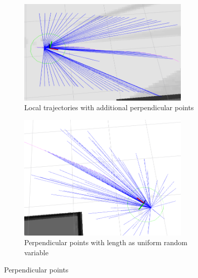 \documentclass[capstone_report.tex]{subfiles}
\begin{document}
\begin{figure}[H]
    \centering
    \begin{subfigure}{0.5\textwidth}
        \centering
        \includegraphics[width=0.9\textwidth]{imgs/local_traj_gen_perp.png}
        \caption{Local trajectories with additional perpendicular points}
    \end{subfigure}%
    \begin{subfigure}{0.5\textwidth}
        \centering
        \includegraphics[width=0.9\textwidth]{imgs/local_traj_gen_random.png}
        \caption{Perpendicular points with length as uniform random variable}
    \end{subfigure}
    \caption{Perpendicular points\label{fig:local_traj_gen_perp}}
\end{figure}
\end{document}
